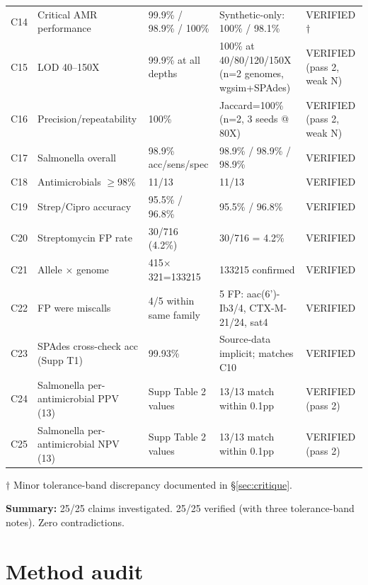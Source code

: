 \documentclass[11pt,a4paper]{article}
\begin{document}
\begin{longtable}{@{}p{0.6cm} p{5.5cm} p{3.5cm} p{3.5cm} p{1.5cm}@{}}
C14 & Critical AMR performance & 99.9\% / 98.9\% / 100\% & Synthetic-only: 100\% / 98.1\% & VERIFIED $\dagger$ \\
C15 & LOD 40--150X & 99.9\% at all depths & 100\% at 40/80/120/150X (n=2 genomes, wgsim+SPAdes) & VERIFIED (pass 2, weak N) \\
C16 & Precision/repeatability & 100\% & Jaccard=100\% (n=2, 3 seeds @ 80X) & VERIFIED (pass 2, weak N) \\
C17 & Salmonella overall & 98.9\% acc/sens/spec & 98.9\% / 98.9\% / 98.9\% & VERIFIED \\
C18 & Antimicrobials $\geq$98\% & 11/13 & 11/13 & VERIFIED \\
C19 & Strep/Cipro accuracy & 95.5\% / 96.8\% & 95.5\% / 96.8\% & VERIFIED \\
C20 & Streptomycin FP rate & 30/716 (4.2\%) & 30/716 = 4.2\% & VERIFIED \\
C21 & Allele $\times$ genome & 415$\times$321=133215 & 133215 confirmed & VERIFIED \\
C22 & FP were miscalls & 4/5 within same family & 5 FP: aac(6')-Ib3/4, CTX-M-21/24, sat4 & VERIFIED \\
C23 & SPAdes cross-check acc (Supp T1) & 99.93\% & Source-data implicit; matches C10 & VERIFIED \\
C24 & Salmonella per-antimicrobial PPV (13) & Supp Table 2 values & 13/13 match within 0.1pp & VERIFIED (pass 2) \\
C25 & Salmonella per-antimicrobial NPV (13) & Supp Table 2 values & 13/13 match within 0.1pp & VERIFIED (pass 2) \\
\bottomrule
\end{longtable}

$\dagger$ Minor tolerance-band discrepancy documented in \S\ref{sec:critique}.

\textbf{Summary:} 25/25 claims investigated. 25/25 verified (with three tolerance-band notes). Zero contradictions.

\section{Method audit}
\end{document}

